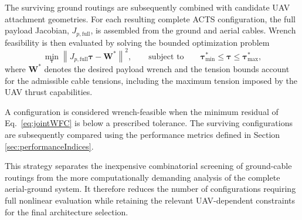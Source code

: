 The surviving ground routings are subsequently combined with candidate UAV attachment geometries. For each resulting complete ACTS configuration, the full payload Jacobian, $J_{p,\mathrm{full}}$, is assembled from the ground and aerial cables. Wrench feasibility is then evaluated by solving the bounded optimization problem
\begin{equation}
    \min_{\boldsymbol{\tau}}
    \left\|
    J_{p,\mathrm{full}}\boldsymbol{\tau}
    -\mathbf{W}^{*}
    \right\|^2,
    \qquad
    \text{subject to}
    \qquad
    \boldsymbol{\tau}_{\min}^{*}
    \leq
    \boldsymbol{\tau}
    \leq
    \boldsymbol{\tau}_{\max}^{*},
    \label{eq:jointWFC}
\end{equation}
where $\mathbf{W}^{*}$ denotes the desired payload wrench and the tension bounds account for the admissible cable tensions, including the maximum tension imposed by the UAV thrust capabilities.

A configuration is considered wrench-feasible when the minimum residual of Eq.~\ref{eq:jointWFC} is below a prescribed tolerance. The surviving configurations are subsequently compared using the performance metrics defined in Section \ref{sec:performanceIndices}.

This strategy separates the inexpensive combinatorial screening of ground-cable routings from the more computationally demanding analysis of the complete aerial-ground system. It therefore reduces the number of configurations requiring full nonlinear evaluation while retaining the relevant UAV-dependent constraints for the final architecture selection.